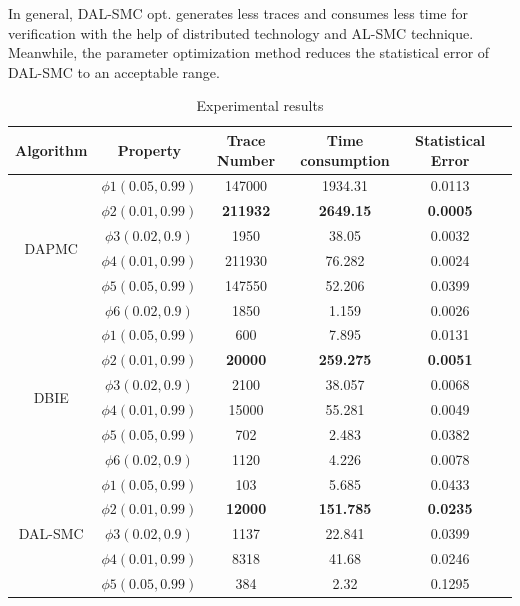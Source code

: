 In general, DAL-SMC opt. generates less traces and consumes less time for verification with the help of distributed technology and AL-SMC technique. Meanwhile, the parameter optimization method reduces the statistical error of DAL-SMC to an acceptable range.
\begin{table}
\caption{Experimental results}
\centering
\begin{tabular}{c c c c c c} 
        \hline  
        Algorithm & Property & Trace Number & Time consumption & Statistical Error\\
        \hline
        \multirow{6}{1.5cm}{DAPMC}  
                & $\phi1(0.05,0.99)$ &  147000&  1934.31&  0.0113\\ 
                & $\phi2(0.01,0.99)$ &  \textbf{211932} &  \textbf{2649.15} &  \textbf{0.0005}\\ 
                & $\phi3(0.02,0.9)$ &  1950&     38.05& 0.0032\\ 
                & $\phi4(0.01,0.99)$ &  211930&  76.282 &  0.0024\\ 
                & $\phi5(0.05,0.99)$ &  147550&  52.206&  0.0399\\ 
                & $\phi6(0.02,0.9)$ &  1850&     1.159& 0.0026\\     
        \hline 
        \multirow{6}{1.5cm}{DBIE}  
                & $\phi1(0.05,0.99)$ &  600&  7.895&  0.0131\\ 
                & $\phi2(0.01,0.99)$ &  \textbf{20000}&  \textbf{259.275} &  \textbf{0.0051} \\ 
                & $\phi3(0.02,0.9)$ &  2100& 38.057& 0.0068\\ 
                & $\phi4(0.01,0.99)$ & 15000&  55.281 &  0.0049\\ 
                & $\phi5(0.05,0.99)$ &  702&  2.483&  0.0382\\ 
                & $\phi6(0.02,0.9)$ &  1120& 4.226& 0.0078\\      
        \hline 
        \multirow{6}{1.5cm}{DAL-SMC}  
                & $\phi1(0.05,0.99)$ &  103&  5.685&  0.0433\\ 
                & $\phi2(0.01,0.99)$ &  \textbf{12000}&  \textbf{151.785} &  \textbf{0.0235} \\ 
                & $\phi3(0.02,0.9)$ &  1137& 22.841& 0.0399\\ 
                & $\phi4(0.01,0.99)$ &  8318&  41.68 &  0.0246\\ 
                & $\phi5(0.05,0.99)$ &  384&  2.32&  0.1295\\ 

\end{tabular}
\end{table}
